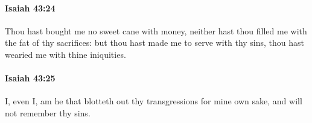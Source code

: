		\paragraph{Isaiah 43:24} %
			\label{ISAIAH-43-24}

			Thou hast bought me no sweet cane with money, neither hast thou filled me with the fat of thy sacrifices: but thou hast made me to serve with thy sins, thou hast wearied me with thine iniquities.


		\paragraph{Isaiah 43:25} %
			\label{ISAIAH-43-25}

			I, even I, am he that blotteth out thy transgressions for mine own sake, and will not remember thy sins.


